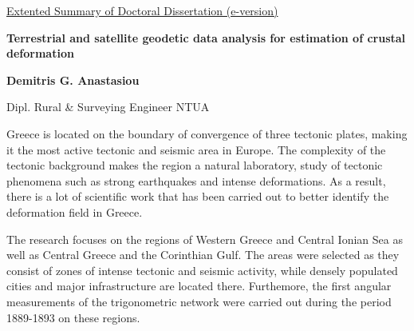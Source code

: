 \begin{extsum}

\graphicspath{{Chapter4/Figs/Vector/}{Chapter4/Figs/}{Chapter5/Figs/Vector/}{Chapter6/Figs/Vector1/}{Chapter7/Figs/Vector/}}

  \begin{center}
  	{\normalsize \underline{Extented Summary of Doctoral Dissertation (e-version)} \par}
    { \Large {\bfseries {Terrestrial and satellite geodetic data analysis for estimation of crustal deformation}} \par}
    {\large \vspace*{1em} {\bfseries {Demitris G. Anastasiou}} \par}
    {\normalsize {Dipl. Rural \& Surveying Engineer NTUA} \par}
  \end{center}

  \let\thefootnote\relax{}
  \let\thefootnote\relax{}
  \let\thefootnote\relax{}


Greece is located on the boundary of convergence of three tectonic plates, making it the most active tectonic and seismic area in Europe. The complexity of the tectonic background makes the region a natural laboratory, study of tectonic phenomena such as strong earthquakes and intense deformations. As a result, there is a lot of scientific work that has been carried out to better identify the deformation field in Greece.

The research focuses on the regions of Western Greece and Central Ionian Sea as well as Central Greece and the Corinthian Gulf. The areas were selected as they consist of zones of intense tectonic and seismic activity, while densely populated cities and major infrastructure are located there. Furthemore, the first angular measurements of the trigonometric network were carried out during the period 1889-1893 on these regions.


\end{extsum}
